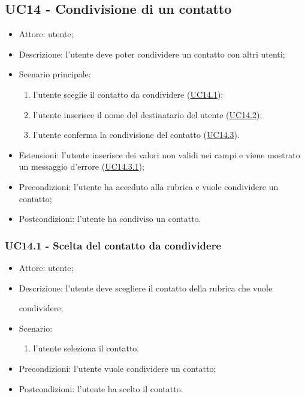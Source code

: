 \subsection{UC14 - Condivisione di un contatto}
\begin{itemize}
    \item Attore: utente;
    \item Descrizione: l'utente deve poter condividere un contatto con altri utenti;
    \item Scenario principale:
        \begin{enumerate}
        \item l'utente sceglie il contatto da condividere (\hyperref[sec: UC14.1]{UC14.1});
        \item l'utente inserisce il nome del destinatario del utente (\hyperref[sec: UC14.2]{UC14.2});
        \item l'utente conferma la condivisione del contatto (\hyperref[sec: UC14.3]{UC14.3}).
        \end{enumerate}
    \item Estensioni: l'utente inserisce dei valori non validi nei campi e viene mostrato un messaggio d'errore (\hyperref[sec: UC14.3.1]{UC14.3.1});
    \item Precondizioni: l'utente ha acceduto alla rubrica e vuole condividere un contatto;
    \item Postcondizioni: l'utente ha condiviso un contatto.
\end{itemize}

\subsubsection{UC14.1 - Scelta del contatto da condividere} \label{sec: UC14.1}
\begin{itemize}
    \item Attore: utente;
    \item Descrizione: l'utente deve scegliere il contatto della rubrica che vuole \par condividere;
    \item Scenario:
        \begin{enumerate}
        \item l'utente seleziona il contatto.
        \end{enumerate}
    
    \item Precondizioni: l'utente vuole condividere un contatto;
    \item Postcondizioni: l'utente ha scelto il contatto.
\end{itemize}


